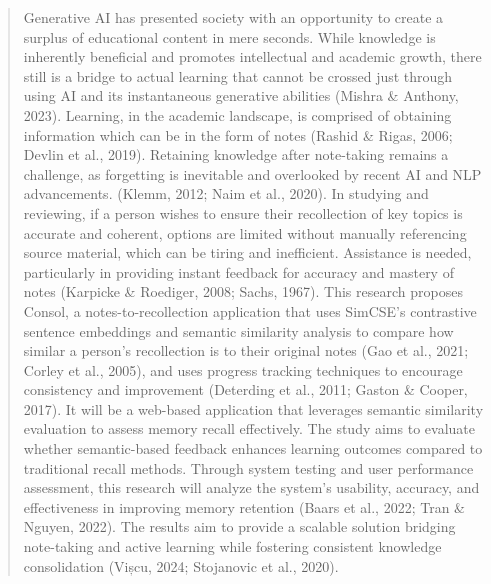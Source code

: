 
\begin{abstract}
Generative AI has presented society with an opportunity to create a surplus of educational content in mere seconds. While knowledge is inherently beneficial and promotes intellectual and academic growth, there still is a bridge to actual learning that cannot be crossed just through using AI and its instantaneous generative abilities (Mishra \& Anthony, 2023). Learning, in the academic landscape, is comprised of obtaining information which can be in the form of notes (Rashid \& Rigas, 2006; Devlin et al., 2019). Retaining knowledge after note-taking remains a challenge, as forgetting is inevitable and overlooked by recent AI and NLP advancements. (Klemm, 2012; Naim et al., 2020). In studying and reviewing, if a person wishes to ensure their recollection of key topics is accurate and coherent, options are limited without manually referencing source material, which can be tiring and inefficient. Assistance is needed, particularly in providing instant feedback for accuracy and mastery of notes (Karpicke \& Roediger, 2008; Sachs, 1967). This research proposes Consol, a notes-to-recollection application that uses SimCSE's contrastive sentence embeddings and semantic similarity analysis to compare how similar a person's recollection is to their original notes (Gao et al., 2021; Corley et al., 2005), and uses progress tracking techniques to encourage consistency and improvement (Deterding et al., 2011; Gaston \& Cooper, 2017). It will be a web-based application that leverages semantic similarity evaluation to assess memory recall effectively. The study aims to evaluate whether semantic-based feedback enhances learning outcomes compared to traditional recall methods. Through system testing and user performance assessment, this research will analyze the system's usability, accuracy, and effectiveness in improving memory retention (Baars et al., 2022; Tran \& Nguyen, 2022). The results aim to provide a scalable solution bridging note-taking and active learning while fostering consistent knowledge consolidation (Vișcu, 2024; Stojanovic et al., 2020).
\end{abstract}
